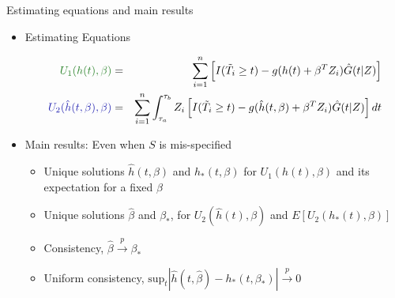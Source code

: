 \documentclass[11pt]{beamer}
\begin{document}
\begin{frame}{Estimating equations and main results}

\begin{itemize}
\vspace{.5em}
\item \textcolor{brick}{Estimating Equations}

\begin{small}
\begin{eqnarray*}
  \textcolor{forest}{U_1(h(t), \beta)} &=& \sum_{i=1}^n 
     \left[I(\tilde{T}_i \geq t) - g(h(t) + \beta^T Z_i)
   \hat{G}(t | Z)\right]  \\
   \textcolor{darkblue}{U_2(\hat{h}(t, \beta), \beta)} 
      &=& \sum_{i=1}^n \int_{\tau_a}^{\tau_b}
      Z_i \left[ I (\tilde{T}_i \geq t) - g(\hat{h}(t, \beta) + \beta^T Z_i)
      \hat{G}(t | Z)\right] dt 
\end{eqnarray*}
\end{small}
  \item \textcolor{brick}{Main results:}  Even when $S$ is
  mis-specified
\begin{itemize}

\normalsize

\item Unique solutions $\hat{h}(t, \beta)$ and $h_*(t, \beta)$ for
$U_1(h(t), \beta)$ and its expectation for a fixed $\beta$

\item Unique solutions $\hat{\beta}$ and $\beta_*$, for $U_2(\hat{h}(t),
\beta)$ and $E[U_2(h_*(t), \beta)]$

\item Consistency, $\hat{\beta} \xrightarrow{p} \beta_*$

\item Uniform consistency, $\text{sup}_t | 
\hat{h}(t, \hat{\beta}) - h_*(t, \beta_*) |
\xrightarrow{p} 0$


\end{itemize}

\end{itemize}

\end{frame}
\end{document}
